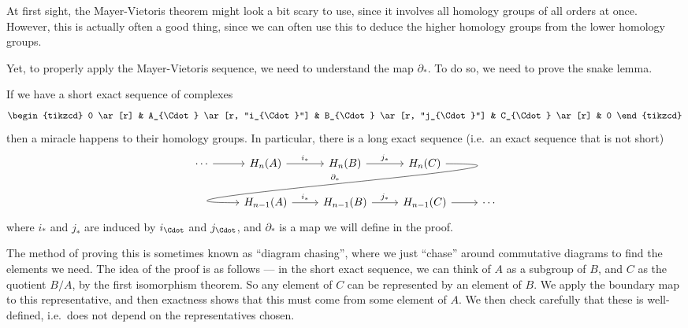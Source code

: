 \documentclass[a4paper]{article}
\begin{document}
At first sight, the Mayer-Vietoris theorem might look a bit scary to use, since it involves all homology groups of all orders at once. However, this is actually often a good thing, since we can often use this to deduce the higher homology groups from the lower homology groups.

Yet, to properly apply the Mayer-Vietoris sequence, we need to understand the map $\partial_*$. To do so, we need to prove the snake lemma.
\begin{thm}
  If we have a short exact sequence of complexes
  \[
    \begin{tikzcd}
      0 \ar[r] & A_{\Cdot} \ar [r, "i_{\Cdot}"] & B_{\Cdot} \ar [r, "j_{\Cdot}"] & C_{\Cdot} \ar[r] & 0
    \end{tikzcd}
  \]
  then a miracle happens to their homology groups. In particular, there is a long exact sequence (i.e.\ an exact sequence that is not short)
  \[
    \begin{tikzcd}
      \cdots \ar [r] & H_n(A) \ar[r, "i_*"] & H_n(B) \ar[r, "j_*"] & H_n(C) \ar[out=0, in=180, looseness=2, overlay, dll, "\partial_*"']\\
      & H_{n - 1}(A) \ar[r, "i_*"] & H_{n - 1}(B) \ar[r, "j_*"] & H_{n - 1}(C) \ar [r] & \cdots
    \end{tikzcd}
  \]
  where $i_*$ and $j_*$ are induced by $i_{\Cdot}$ and $j_{\Cdot}$, and $\partial_*$ is a map we will define in the proof.
\end{thm}
The method of proving this is sometimes known as ``diagram chasing'', where we just ``chase'' around commutative diagrams to find the elements we need. The idea of the proof is as follows --- in the short exact sequence, we can think of $A$ as a subgroup of $B$, and $C$ as the quotient $B/A$, by the first isomorphism theorem. So any element of $C$ can be represented by an element of $B$. We apply the boundary map to this representative, and then exactness shows that this must come from some element of $A$. We then check carefully that these is well-defined, i.e.\ does not depend on the representatives chosen.
\end{document}
